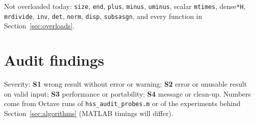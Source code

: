 \documentclass[11pt]{article}
\newcommand{\code}[1]{\texttt{#1}}
\newcommand{\sev}[1]{\textbf{#1}}
\begin{document}
\noindent Not overloaded today: \code{size}, \code{end}, \code{plus}, \code{minus}, \code{uminus}, scalar
\code{mtimes}, dense\code{*H}, \code{mrdivide}, \code{inv}, \code{det}, \code{norm}, \code{disp}, \code{subsasgn},
and every function in Section~\ref{sec:overloads}.

\section{Audit findings}\label{sec:bugs}
Severity: \sev{S1} wrong result without error or warning; \sev{S2} error or unusable result on valid input;
\sev{S3} performance or portability; \sev{S4} message or clean-up. Numbers come from Octave runs of
\code{hss\_audit\_probes.m} or of the experiments behind Section~\ref{sec:algorithms} (MATLAB timings will differ).
\end{document}

